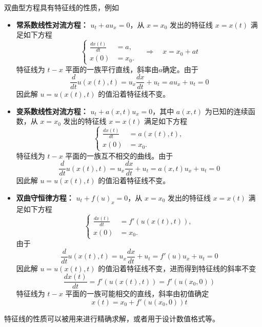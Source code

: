 双曲型方程具有特征线的性质，例如
\begin{itemize}
    \item \textbf{常系数线性对流方程：} $u_t + a u_x = 0$，从 $x=x_0$ 发出的特征线 $x=x(t)$ 满足如下方程
          \[
              \left\{
              \begin{aligned}
                  \frac{d x(t)}{d t} & = a,   \\
                  x(0)               & = x_0.
              \end{aligned}
              \right. \quad \Rightarrow \quad x = x_0 + a t
          \]
          特征线为 $t\!-\!x$ 平面的一族平行直线，斜率由$a$确定。由于
          \[
              \frac{d}{d t}u(x(t),t) = u_x \frac{d x}{d t} + u_t = a u_x + u_t = 0
          \]
          因此解 $u = u(x(t),t)$ 的值沿着特征线不变。
    \item \textbf{变系数线性对流方程：} $u_t + a(x,t) u_x = 0$，其中 $a(x,t)$ 为已知的连续函数，从 $x=x_0$ 发出的特征线 $x=x(t)$ 满足如下方程
          \[
              \left\{
              \begin{aligned}
                  \frac{d x(t)}{d t} & = a(x(t),t), \\
                  x(0)               & = x_0.
              \end{aligned}
              \right.
          \]
          特征线为 $t\!-\!x$ 平面的一族互不相交的曲线。由于
          \[
              \frac{d}{d t}u(x(t),t) = u_x \frac{d x}{d t} + u_t = a(x,t) u_x + u_t = 0
          \]
          因此解 $u = u(x(t),t)$ 的值沿着特征线不变。
    \item \textbf{双曲守恒律方程：} $u_t + f(u)_x = 0$，从 $x=x_0$ 发出的特征线 $x=x(t)$ 满足如下方程
          \[
              \left\{
              \begin{aligned}
                  \frac{d x(t)}{d t} & = f'(u(x(t),t)), \\
                  x(0)               & = x_0.
              \end{aligned}
              \right.
          \]
          由于
          \[
              \frac{d}{d t}u(x(t),t) = u_x \frac{d x}{d t} + u_t = f'(u) u_x + u_t = 0
          \]
          因此解 $u = u(x(t),t)$ 的值沿着特征线不变，进而得到特征线的斜率不变
          \[
              \frac{d x(t)}{d t} = f'(u(x(t),t)) = f'(u(x_0,0))
          \]
          特征线为 $t\!-\!x$ 平面的一族可能相交的直线，斜率由初值确定
          \[
              x(t) = x_0 + f'(u(x_0,0)) t
          \]
\end{itemize}
特征线的性质可以被用来进行精确求解，或者用于设计数值格式等。


